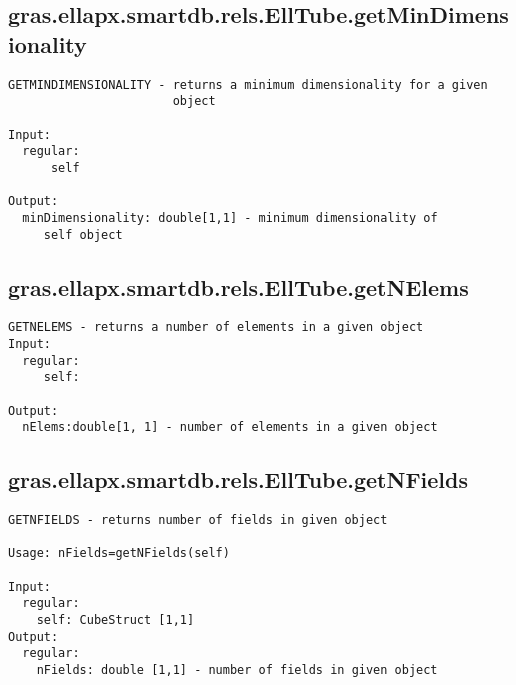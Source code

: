 \subsection{\texorpdfstring{gras.ellapx.smartdb.rels.EllTube.getMinDimensionality}{getMinDimensionality}}\label{method:gras.ellapx.smartdb.rels.EllTube.getMinDimensionality}
\begin{verbatim}
GETMINDIMENSIONALITY - returns a minimum dimensionality for a given
                       object

Input:
  regular:
      self

Output:
  minDimensionality: double[1,1] - minimum dimensionality of
     self object
\end{verbatim}
\subsection{\texorpdfstring{gras.ellapx.smartdb.rels.EllTube.getNElems}{getNElems}}\label{method:gras.ellapx.smartdb.rels.EllTube.getNElems}
\begin{verbatim}
GETNELEMS - returns a number of elements in a given object
Input:
  regular:
     self:

Output:
  nElems:double[1, 1] - number of elements in a given object
\end{verbatim}
\subsection{\texorpdfstring{gras.ellapx.smartdb.rels.EllTube.getNFields}{getNFields}}\label{method:gras.ellapx.smartdb.rels.EllTube.getNFields}
\begin{verbatim}
GETNFIELDS - returns number of fields in given object

Usage: nFields=getNFields(self)

Input:
  regular:
    self: CubeStruct [1,1]
Output:
  regular:
    nFields: double [1,1] - number of fields in given object
\end{verbatim}
